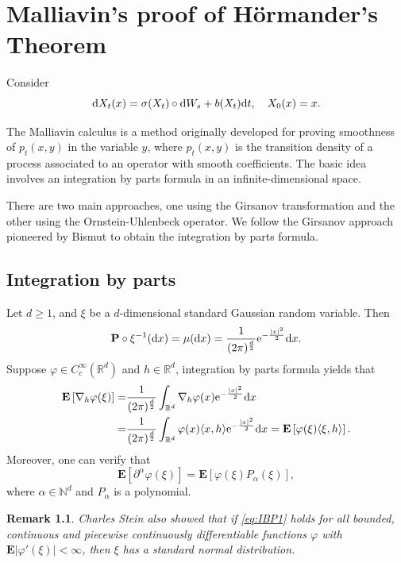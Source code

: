 \documentclass[twoside, 12pt]{book}
\numberwithin{equation}{chapter}
\newtheorem{remark}[theorem]{Remark}
\def\mN{{\mathbb N}}
\def\mR{{\mathbb R}}
\def\bE{{\mathbf E}}
\def\bP{{\mathbf P}}
\def\l{\left}
\def\r{\right}
\def\<{\langle}
\def\>{\rangle}
\def\geq{\geqslant}
\def\d{\text{\rm{d}}}
\def\e{\mathrm{e}}
\begin{document}
	\chapter{Malliavin's proof of H\"ormander's Theorem}\label{chapt:hormander}
     Consider 
     \begin{equation}\label{eq:sde-S}
         \d X_t(x)=\sigma(X_t)\circ \d W_s+ b(X_t) \d t, \quad X_0(x)=x.
     \end{equation}
     
     The Malliavin calculus is a method originally developed for proving smoothness of $p_t(x,y)$ in the variable $y$, where $p_t(x,y)$ is the transition density of a process associated to an operator with smooth coefficients. The basic idea involves an integration by parts formula in an infinite-dimensional space.

     There are two main approaches, one using the Girsanov transformation and the other using the Ornstein-Uhlenbeck operator. We follow the Girsanov approach pioneered by Bismut \cite{bismut1981martingales} to obtain the integration by parts formula. 

    \section{Integration by parts}
    
    Let $d\geq 1$, and $\xi$ be a $d$-dimensional standard Gaussian random variable. Then 
    \[
    \bP\circ \xi^{-1}(\d x)=\mu(\d x)=\frac{1}{({2\pi})^{\frac{d}{2}}}\e^{-\frac{|x|^2}{2}} \d x. 
    \]
    Suppose $\varphi\in C_c^\infty(\mR^d)$ and $h\in \mR^d$, integration by parts formula yields that 
    \begin{equation}\label{eq:IBP1}
        \begin{aligned}
        \bE \l[\nabla_h \varphi(\xi)\r]=&\frac{1}{(2\pi)^{\frac{d}{2}}}\int_{\mR^d}\nabla_h \varphi(x)\e^{-\frac{|x|^2}{2}} \d x\\
        =&\frac{1}{(2\pi)^{\frac{d}{2}}}\int_{\mR^d} \varphi(x)\<x,h\> \e^{-\frac{|x|^2}{2}} \d x=\bE \l[\varphi(\xi)\<\xi,h\>\r]. 
        \end{aligned}
    \end{equation}
    Moreover, one can verify that 
    \begin{equation}\label{eq:IBP2}
        \bE [\partial^\alpha \varphi(\xi)]= \bE [\varphi(\xi)P_\alpha(\xi)], 
    \end{equation}
    where $\alpha\in \mN^d$ and $P_\alpha$ is a polynomial.
    \begin{remark}
        Charles Stein also showed that if \eqref{eq:IBP1} holds for all bounded, continuous and piecewise continuously differentiable functions $\varphi$ with $\bE|\varphi'(\xi)|<\infty$, then $\xi$ has a standard normal distribution.
    \end{remark}
\end{document}
